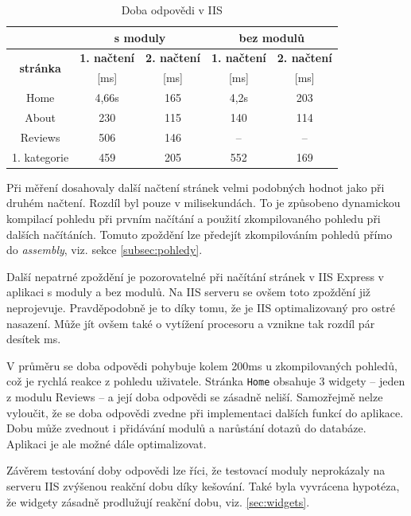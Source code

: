 \documentclass[11pt,twoside,a4paper]{book}
\begin{document}
\begin{table}[h!]
\centering
\begin{tabular}[c]{|c||c|c||c|c|}
\hline
 & \multicolumn{2}{c||}{\textbf{s moduly}} & \multicolumn{2}{|c|}{\textbf{bez modulů}} \\
\hline 
\multirow{2}{*}{\textbf{stránka}} & \textbf{1. načtení} & \textbf{2. načtení} & \textbf{1. načtení} & \textbf{2. načtení} \\ 
& [ms] & [ms] & [ms] & [ms] \\
\hline 
Home         & 4,66s  & 165 & 4,2s & 203 \\ 
\hline 
About        & 230  & 115 & 140 & 114 \\ 
\hline 
Reviews      & 506  & 146 & -- & -- \\ 
\hline 
1. kategorie & 459  & 205 & 552 & 169 \\ 
\hline 
\end{tabular}
\caption{Doba odpovědi v IIS}
\label{tab:testIIS}
\end{table} 

Při měření dosahovaly další načtení stránek velmi podobných hodnot jako při druhém načtení. Rozdíl byl pouze v milisekundách. To je způsobeno dynamickou kompilací pohledu při prvním načítání a použití zkompilovaného pohledu při dalších načítáních. Tomuto zpoždění lze předejít zkompilováním pohledů přímo do \textit{assembly}, viz. sekce \ref{subsec:pohledy}.

Další nepatrné zpoždění je pozorovatelné při načítání stránek v IIS Express v aplikaci s moduly a bez modulů. Na IIS serveru se ovšem toto zpoždění již neprojevuje. Pravděpodobně je to díky tomu, že je IIS optimalizovaný pro ostré nasazení. Může jít ovšem také o vytížení procesoru a vznikne tak rozdíl pár desítek ms. 

V průměru se doba odpovědi pohybuje kolem 200ms u zkompilovaných pohledů, což je rychlá reakce z pohledu uživatele. Stránka \texttt{Home} obsahuje 3 widgety -- jeden z modulu \textsf{Reviews} -- a její doba odpovědi se zásadně neliší. Samozřejmě nelze vyloučit, že se doba odpovědi zvedne při implementaci dalších funkcí do aplikace. Dobu může zvednout i přidávání modulů a narůstání dotazů do databáze. Aplikaci je ale možné dále optimalizovat. 

Závěrem testování doby odpovědi lze říci, že testovací moduly neprokázaly na serveru IIS zvýšenou reakční dobu díky kešování. Také byla vyvrácena hypotéza, že widgety zásadně prodlužují reakční dobu, viz. \ref{sec:widgets}.
\end{document}
